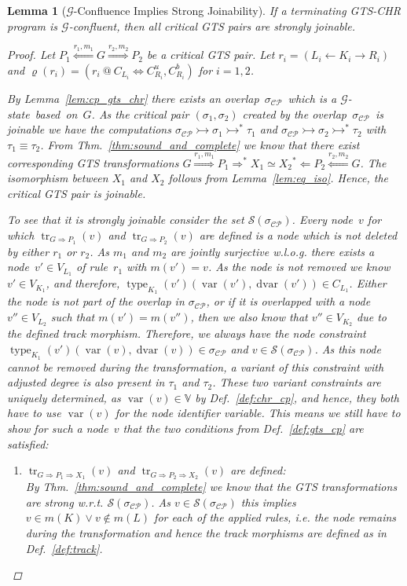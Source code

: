 \documentclass{tlp}
\newtheorem{lemma}[theorem]{Lemma}
\newcommand{\mcCP}{\ensuremath{\mathcal{CP}}}
\newcommand{\mcG}{\ensuremath{\mathcal{G}}}
\newcommand{\bbV}{\ensuremath{\mathbb{V}}}
\newcommand{\sigcp}{\ensuremath{\sigma_{\mcCP}}}
\newcommand{\der}{\ensuremath{\rightarrowtail}}
\newcommand{\dergts}{\ensuremath{\Rightarrow}}
\DeclareMathOperator{\var}{var}
\DeclareMathOperator{\dvar}{dvar}
\DeclareMathOperator{\type}{type}
\DeclareMathOperator{\track}{tr}
\newcommand{\chrrule}{\ensuremath{\varrho}}
\newcommand{\strong}{\ensuremath{\mathcal{S}}}
\begin{document}
\begin{lemma}[$\mathcal{G}$-Confluence Implies Strong Joinability]
\label{lem:confluence_chr_gts}
If a terminating GTS-CHR program is \mcG-confluent, then all critical GTS pairs
are strongly joinable.

\begin{proof}
Let $P_1 \stackrel{r_1,m_1}{\Longleftarrow} G \stackrel{r_2,
m_2}{\Longrightarrow} P_2$ be a critical GTS pair. Let $r_i = (L_i \leftarrow K_i
\rightarrow R_i)$ and $\chrrule(r_i) = (r_i\ @\ C_{L_i} \Leftrightarrow
C_{R_i}^u,C_{R_i}^b)$ for $i=1,2$.

By Lemma~\ref{lem:cp_gts_chr} there exists an overlap~\sigcp\ which is a
\mcG-state~based~on~$G$. As the critical pair $(\sigma_1,\sigma_2)$ created by
the overlap~\sigcp\ is joinable we have the computations $\sigcp \der \sigma_1
\der^* \tau_1$ and $\sigcp \der \sigma_2 \der^* \tau_2$ with $\tau_1 \equiv
\tau_2$. From Thm.~\ref{thm:sound_and_complete} we know that there exist
corresponding GTS transformations $G \stackrel{r_1,m_1}{\Longrightarrow} P_1
\Longrightarrow^* X_1 \simeq X_2 {}^*\!\!\Longleftarrow P_2
\stackrel{r_2,m_2}{\Longleftarrow} G$. The isomorphism between $X_1$ and $X_2$
follows from Lemma~\ref{lem:eq_iso}. Hence, the critical GTS pair is joinable.

To see that it is strongly joinable consider the set $\strong(\sigcp)$. Every
node~$v$ for which $\track_{G \dergts P_1}(v)$ and $\track_{G \dergts P_2}(v)$
are defined is a node which is not deleted by either $r_1$ or $r_2$. As $m_1$ and
$m_2$ are jointly surjective w.l.o.g. there exists a node~$v' \in V_{L_1}$ of
rule~$r_1$ with $m(v') = v$. As the node is not removed we know $v' \in V_{K_1}$,
and therefore, $\type_{K_1}(v')(\var(v'), \dvar(v')) \in C_{L_1}$. Either the
node is not part of the overlap in $\sigcp$, or if it is overlapped with a
node~$v'' \in V_{L_2}$ such that $m(v') = m(v'')$, then we also know that $v''
\in V_{K_2}$ due to the defined track morphism. Therefore, we always have the
node constraint~$\type_{K_1}(v')(\var(v), \dvar(v)) \in \sigcp$ and $v \in
\strong(\sigcp)$. As this node cannot be removed during the transformation, a
variant of this constraint with adjusted degree is also present in $\tau_1$ and
$\tau_2$. These two variant constraints are uniquely determined, as $\var(v) \in
\bbV$ by Def.~\ref{def:chr_cp}, and hence, they both have to use $\var(v)$ for
the node identifier variable. This means we still have to show for such a
node~$v$ that the two conditions from Def.~\ref{def:gts_cp} are satisfied:
\begin{enumerate}
  \item $\track_{G \dergts P_1 \dergts X_1}(v)$ and $\track_{G
  \dergts P_2 \dergts X_2}(v)$ are defined:\\
  By Thm.~\ref{thm:sound_and_complete} we know that the GTS transformations are strong
  w.r.t. $\strong(\sigcp)$. As $v \in \strong(\sigcp)$ this implies $v \in m(K)
  \lor v \not \in m(L)$ for each of the applied rules, i.e. the node remains
  during the transformation and hence the track morphisms are defined as in
  Def.~\ref{def:track}.


\end{enumerate}
\end{proof}
\end{lemma}
\end{document}
